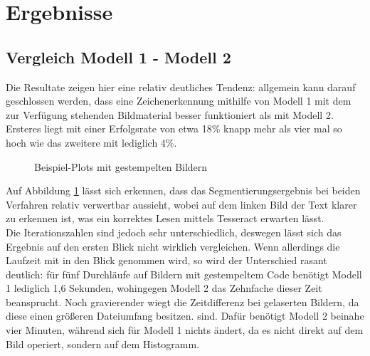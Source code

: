 	\section{Ergebnisse}
	\label{sec:results}
	
		\subsection{Vergleich Modell 1 - Modell 2}
		\label{sub:comp-m1-m2}
			Die Resultate zeigen hier eine relativ deutliches Tendenz: allgemein kann darauf geschlossen werden, dass eine Zeichenerkennung mithilfe von Modell 1 mit dem zur Verfügung stehenden Bildmaterial besser funktioniert als mit Modell 2. Ersteres liegt mit einer Erfolgsrate von etwa 18\% knapp mehr als vier mal so hoch wie das zweitere mit lediglich 4\%.
			\begin{figure}[H]
				\centering
				\caption{Beispiel-Plots mit gestempelten Bildern}
				\label{fig:vgl-4-1}
			\end{figure}
			Auf Abbildung \ref{fig:vgl-4-1} lässt sich erkennen, dass das Segmentierungsergebnis bei beiden Verfahren relativ verwertbar aussieht, wobei auf dem linken Bild der Text klarer zu erkennen ist, was ein korrektes Lesen mittels Tesseract erwarten lässt. \\
			Die Iterationszahlen sind jedoch sehr unterschiedlich, deswegen lässt sich das Ergebnis auf den ersten Blick nicht wirklich vergleichen. Wenn allerdings die Laufzeit mit in den Blick genommen wird, so wird der Unterschied rasant deutlich: für fünf Durchläufe auf Bildern mit gestempeltem Code benötigt Modell 1 lediglich 1,6 Sekunden, wohingegen Modell 2 das Zehnfache dieser Zeit beansprucht. Noch gravierender wiegt die Zeitdifferenz bei gelaserten Bildern, da diese einen größeren Dateiumfang besitzen. sind. Dafür benötigt Modell 2 beinahe vier Minuten, während sich für Modell 1 nichts ändert, da es nicht direkt auf dem Bild operiert, sondern auf dem Histogramm.\\
